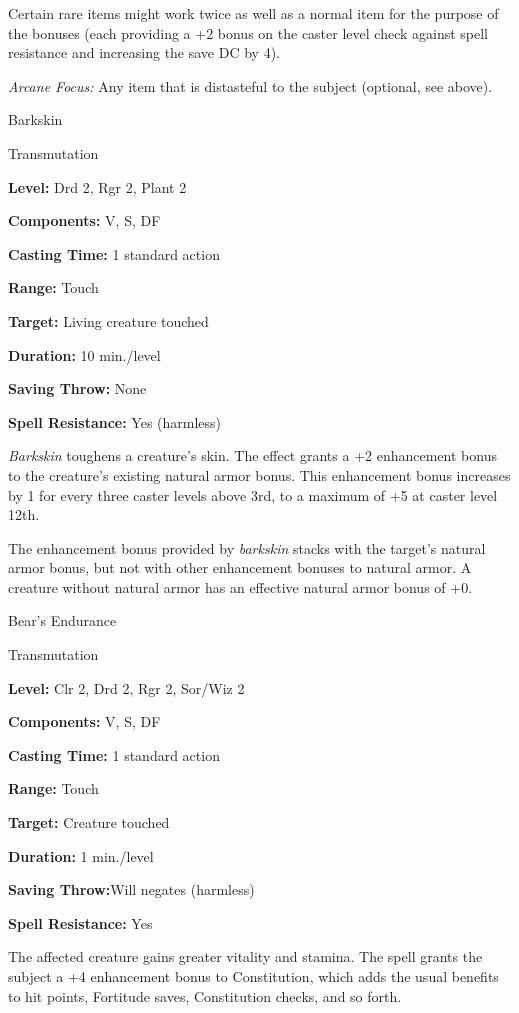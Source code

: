 \documentclass{article}
\begin{document}
Certain rare items might work twice as well as a normal item for the purpose of 
the bonuses (each providing a +2 bonus on the caster level check against spell 
resistance and increasing the save DC by 4).

\textit{Arcane Focus: }Any item that is distasteful to the subject (optional, see 
above).

\vspace{12pt}
Barkskin

Transmutation

\textbf{Level:} Drd 2, Rgr 2, Plant 2

\textbf{Components:} V, S, DF

\textbf{Casting Time:} 1 standard action

\textbf{Range:} Touch

\textbf{Target:} Living creature touched

\textbf{Duration:} 10 min./level

\textbf{Saving Throw:} None

\textbf{Spell Resistance:} Yes (harmless)

\textit{Barkskin }toughens a creature's skin. The effect grants a +2 enhancement 
bonus to the creature's existing natural armor bonus. This enhancement bonus increases 
by 1 for every three caster levels above 3rd, to a maximum of +5 at caster level 
12th.

The enhancement bonus provided by \textit{barkskin }stacks with the target's natural 
armor bonus, but not with other enhancement bonuses to natural armor. A creature 
without natural armor has an effective natural armor bonus of +0.

\vspace{12pt}
Bear's Endurance

Transmutation

\textbf{Level:} Clr 2, Drd 2, Rgr 2, Sor/Wiz 2

\textbf{Components:} V, S, DF

\textbf{Casting Time:} 1 standard action

\textbf{Range:} Touch

\textbf{Target:} Creature touched

\textbf{Duration:} 1 min./level

\textbf{Saving Throw:}Will negates (harmless)

\textbf{Spell Resistance:} Yes

The affected creature gains greater vitality and stamina. The spell grants the 
subject a +4 enhancement bonus to Constitution, which adds the usual benefits to 
hit points, Fortitude saves, Constitution checks, and so forth.
\end{document}
